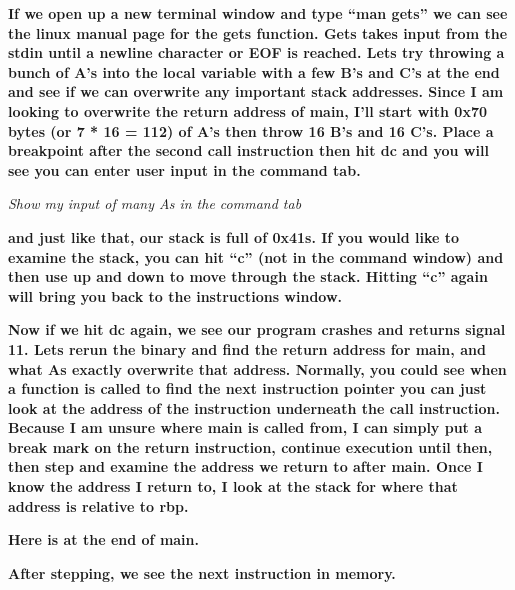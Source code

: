   
 

\textbf{If we open up a new terminal window and type ``man gets'' we can see the linux manual page for the gets
function. Gets takes input from the stdin until a newline character or EOF is reached. Lets try throwing a bunch of A's
into the local variable with a few B's and C's at the end and see if we can overwrite any important stack addresses.
Since I am looking to overwrite the return address of main, I'll start with 0x70 bytes (or 7 * 16 = 112) of A's then
throw 16 B's and 16 C's. Place a breakpoint after the second call instruction then hit dc and you will see you can
enter user input in the command tab.}

  
 

\textit{Show my input of many As in the command tab}

\textbf{and just like that, our stack is full of 0x41s. If you would like to examine the stack, you can hit ``c'' (not
in the command window) and then use up and down to move through the stack. Hitting ``c'' again will bring you back to
the instructions window.}

  
 

\textbf{Now if we hit dc again, we see our program crashes and returns signal 11. Lets rerun the binary and find the
return address for main, and what As exactly overwrite that address. Normally, you could see when a function is called
to find the next instruction pointer you can just look at the address of the instruction underneath the call
instruction. Because I am unsure where main is called from, I can simply put a break mark on the return instruction,
continue execution until then, then step and examine the address we return to after main. Once I know the address I
return to, I look at the stack for where that address is relative to rbp.}

\textbf{Here is at the end of main.}\newline
  
 

\textbf{After stepping, we see the next instruction in memory.\newline
}  
 

